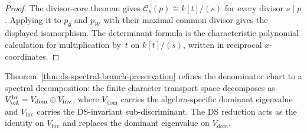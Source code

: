 \begin{proof}
The divisor-core theorem gives
$\mathcal{C}_s(p)\cong k[t]/(s)$ for every divisor $s\mid p$.
Applying it to $p_{\widehat{\mathfrak{g}}}$ and $p_{\mathcal{W}}$
with their maximal common divisor gives the displayed isomorphism.
The determinant formula is the characteristic polynomial calculation
for multiplication by~$t$ on $k[t]/(s)$, written in reciprocal
$x$-coordinates.
\end{proof}

\begin{remark}
\label{rem:ds-spectral-decomposition}
Theorem~\ref{thm:ds-spectral-branch-preservation} refines the
denominator chart to a spectral decomposition: the finite-character
transport space decomposes as
$V_{\cA}^{\mathrm{br}} = V_{\mathrm{dom}} \oplus
V_{\mathrm{inv}}$, where $V_{\mathrm{dom}}$ carries the
algebra-specific dominant eigenvalue and $V_{\mathrm{inv}}$
carries the DS-invariant sub-discriminant. The DS reduction
acts as the identity on $V_{\mathrm{inv}}$ and replaces the
dominant eigenvalue on $V_{\mathrm{dom}}$.
\end{remark}

